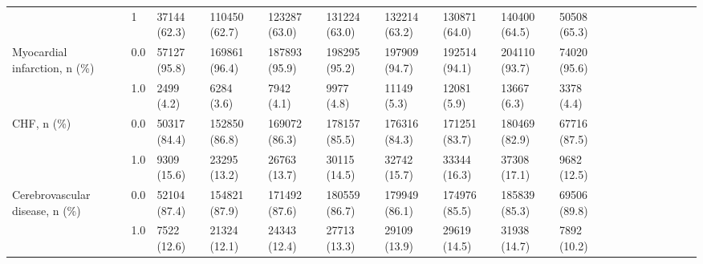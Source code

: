 \begin{tabular}{llllllllllllllllll}
                                       & 1 &                 37144 (62.3) &   110450 (62.7) &   123287 (63.0) &   131224 (63.0) &   132214 (63.2) &   130871 (64.0) &   140400 (64.5) &   50508 (65.3) &                   &                    &                    &                    &                    &                     &                     &                     \\
Myocardial infarction, n (\%) & 0.0 &                 57127 (95.8) &   169861 (96.4) &   187893 (95.9) &   198295 (95.2) &   197909 (94.7) &   192514 (94.1) &   204110 (93.7) &   74020 (95.6) &                   &                    &                    &                    &                    &                     &                     &                     \\
                                       & 1.0 &                   2499 (4.2) &      6284 (3.6) &      7942 (4.1) &      9977 (4.8) &     11149 (5.3) &     12081 (5.9) &     13667 (6.3) &     3378 (4.4) &                   &                    &                    &                    &                    &                     &                     &                     \\
CHF, n (\%) & 0.0 &                 50317 (84.4) &   152850 (86.8) &   169072 (86.3) &   178157 (85.5) &   176316 (84.3) &   171251 (83.7) &   180469 (82.9) &   67716 (87.5) &                   &                    &                    &                    &                    &                     &                     &                     \\
                                       & 1.0 &                  9309 (15.6) &    23295 (13.2) &    26763 (13.7) &    30115 (14.5) &    32742 (15.7) &    33344 (16.3) &    37308 (17.1) &    9682 (12.5) &                   &                    &                    &                    &                    &                     &                     &                     \\
Cerebrovascular disease, n (\%) & 0.0 &                 52104 (87.4) &   154821 (87.9) &   171492 (87.6) &   180559 (86.7) &   179949 (86.1) &   174976 (85.5) &   185839 (85.3) &   69506 (89.8) &                   &                    &                    &                    &                    &                     &                     &                     \\
                                       & 1.0 &                  7522 (12.6) &    21324 (12.1) &    24343 (12.4) &    27713 (13.3) &    29109 (13.9) &    29619 (14.5) &    31938 (14.7) &    7892 (10.2) &                   &                    &                    &                    &                    &                     &                     &                     \\

\end{tabular}
